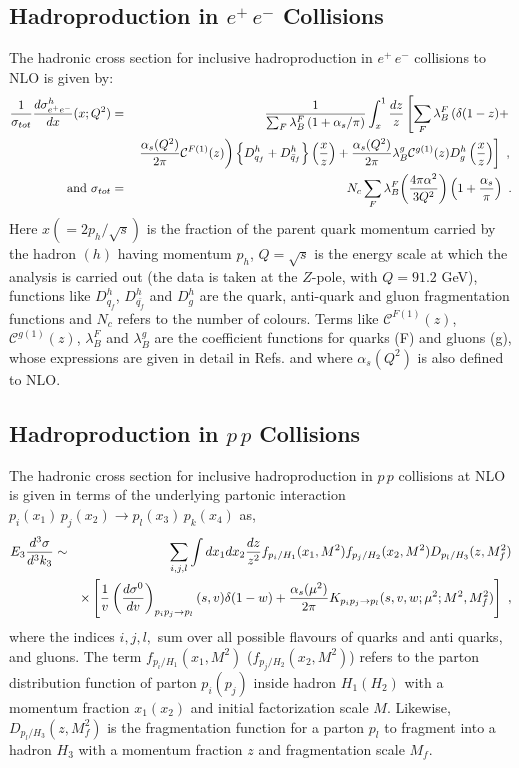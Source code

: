\documentclass{ws-ijmpa}
\def\ra{{\rightarrow}}
\def\nn{{\nonumber}}
\def\mc{\mathcal}
\def\lm{{\lambda}}
\def\s{{\sigma}}
\def\al{{\alpha}}
\def\dl{{\delta}}
\begin{document}
\subsection{Hadroproduction in $e^+\,e^-$ Collisions}
\label{EEprod}
The hadronic cross section for inclusive hadroproduction in $e^+\,e^-$
collisions to NLO is given by\cite{Fur}:
\begin{eqnarray} \nonumber
\frac{1}{\s_{tot}} \frac{d\s^{h}_{e^+e^-}}{dx}(x;Q^2)
& = & \frac{1}{\sum_F\lm_B^F \left(1 + {\al_s}/{\pi}\right)}
\int_x^1 \frac{dz}{z}\left[ \sum_F
\lm_B^F\left(\dl(1-z)+ \right. \right. \\ \nonumber
 & & \left. \left. \frac{\al_s(Q^2)}{2\pi} \mc C^{F(1)}(z) \right)
\left\{D^h_{q_f} +D^h_{\bar q_f}\right\}\left(\frac
xz\right) + \frac{\al_s(Q^2)}{2\pi}\lm_B^g\mc
        C^{g(1)}(z)D^h_g\left(\frac xz\right)\right]~, \nn \\
\hbox{and  }
\s_{tot} & = & N_c \sum_F{\lm_B^F}{\left(\frac{4\pi\al^2}{3Q^2}\right)}
\left( 1 + \frac{\al_s}{\pi}\right)~.
\label{eq:coeff}
\end{eqnarray}
Here $x (=2 p_h/\sqrt{s})$ is the fraction of the parent quark momentum
carried by the hadron $(h)$ having momentum $p_h$, $Q= \sqrt{s}$ is the
energy scale at which the analysis is carried out (the data is taken
at the $Z$-pole, with $Q = 91.2$ GeV), functions like $D^h_{q_f}$,
$D^h_{\bar{q_{f}}}$ and $D^h_g$ are the quark, anti-quark and gluon
fragmentation functions and $N_c$ refers to the number of colours.
Terms like $\mc C^{F(1)}(z)$, $\mc C^{g(1)}(z)$, $\lm_B^F$ and $\lm_B^g$
are the coefficient functions for quarks (F) and gluons (g), whose
expressions are given in detail in Refs.\cite{Savinlo,Fur}
and where $\alpha_s (Q^2)$ is also defined to NLO.

\subsection{Hadroproduction in $p\,p$ Collisions}
\label{PPprod}

The hadronic cross section for inclusive hadroproduction in $p\,p$ collisions
at NLO is given in terms of the underlying partonic interaction $p_i(x_1) \,
p_j (x_2) \rightarrow p_l(x_3)\,  p_k(x_4)$ as\cite{Aversa},
\begin{eqnarray}
E_3 \frac{d^3\sigma}{d^3k_3} &\sim& \sum_{i,j,l} \int dx_1dx_2
       \frac{dz}{z^2} f_{p_i/H_1}(x_1, M^2)
        f_{p_j/H_2}(x_2, M^2) D_{p_l/H_3}(z, M^2_f) \nn \\
 & & \times \left[\frac{1}{v} \left( \frac{d\sigma^0}{dv}
       \right)_{p_ip_j \ra p_l} (s,v) \delta(1-w) +
       \frac{\alpha_s(\mu^2)}{2\pi}K_{p_ip_j \ra p_l}
       (s,v,w;\mu^2;M^2,M^2_f)\right]~,
\label{eq:crosssec}
\end{eqnarray}
where the indices $i, j, l,$ sum over all possible flavours of
quarks and anti quarks, and gluons. The term $f_{p_i/H_1}(x_1, M^2)$
($f_{p_j/H_2}(x_2, M^2)$) refers to the parton distribution function
of parton $p_i ( p_j)$ inside hadron $H_1 (H_2)$ with a momentum
fraction $x_1 (x_2)$ and initial factorization scale $M$. Likewise,
$D_{p_l/H_3}(z, M^2_f)$ is the fragmentation function for a parton
$p_l$ to fragment into a hadron $H_3$ with a momentum fraction $z$
and fragmentation scale $M_f$.
\end{document}
